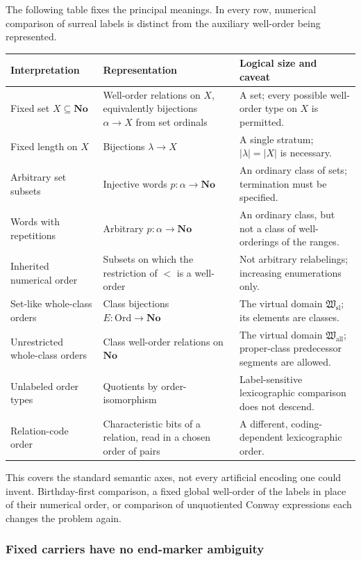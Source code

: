 \documentclass[11pt]{article}
\theoremstyle{definition}
\theoremstyle{remark}
\newcommand{\No}{\mathbf{No}}
\newcommand{\Ord}{\mathrm{Ord}}
\newcommand{\Hsl}{\mathfrak W_{\mathrm{sl}}}
\newcommand{\Hall}{\mathfrak W_{\mathrm{all}}}
\begin{document}
The following table fixes the principal meanings. In every row, numerical
comparison of surreal labels is distinct from the auxiliary well-order
being represented.

\begin{longtable}{@{}>{\raggedright\arraybackslash}p{}>{\raggedright\arraybackslash}p{}>{\raggedright\arraybackslash}p{}@{}}
\toprule
Interpretation & Representation & Logical size and caveat\\
\midrule\endhead
Fixed set $X\subseteq\No$ & Well-order relations on $X$, equivalently
bijections $\alpha\to X$ from set ordinals & A set; every possible
well-order type on $X$ is permitted.\\[4pt]
Fixed length on $X$ & Bijections $\lambda\to X$ & A single stratum;
$|\lambda|=|X|$ is necessary.\\[4pt]
Arbitrary set subsets & Injective words $p:\alpha\to\No$ & An ordinary
class of sets; termination must be specified.\\[4pt]
Words with repetitions & Arbitrary $p:\alpha\to\No$ & An ordinary
class, but not a class of well-orderings of the ranges.\\[4pt]
Inherited numerical order & Subsets on which the restriction of $<$ is
a well-order & Not arbitrary relabelings; increasing enumerations only.\\[4pt]
Set-like whole-class orders & Class bijections $E:\Ord\to\No$ & The
virtual domain $\Hsl$; its elements are classes.\\[4pt]
Unrestricted whole-class orders & Class well-order relations on $\No$ &
The virtual domain $\Hall$; proper-class predecessor segments are allowed.\\[4pt]
Unlabeled order types & Quotients by order-isomorphism & Label-sensitive
lexicographic comparison does not descend.\\[4pt]
Relation-code order & Characteristic bits of a relation, read in a chosen
order of pairs & A different, coding-dependent lexicographic order.\\
\bottomrule
\end{longtable}

This covers the standard semantic axes, not every artificial encoding one
could invent. Birthday-first comparison, a fixed global well-order of the
labels in place of their numerical order, or comparison of unquotiented
Conway expressions each changes the problem again.

\subsubsection{Fixed carriers have no end-marker ambiguity}
\end{document}
